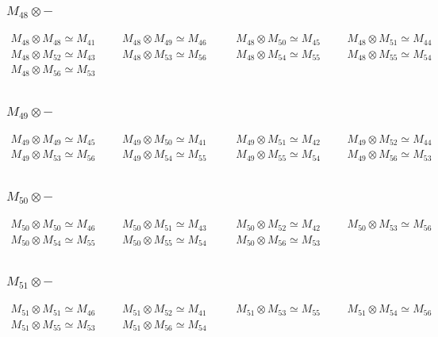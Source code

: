 \subsubsection{$M_48\otimes -$}
\begin{align*}
M_{48} \otimes M_{48} \simeq M_{41} &&& M_{48} \otimes M_{49} \simeq M_{46} &&\
& M_{48} \otimes M_{50} \simeq M_{45} &&& M_{48} \otimes M_{51} \simeq M_{44}\
\\
M_{48} \otimes M_{52} \simeq M_{43} &&& M_{48} \otimes M_{53} \simeq M_{56} &&\
& M_{48} \otimes M_{54} \simeq M_{55} &&& M_{48} \otimes M_{55} \simeq M_{54}\
\\
M_{48} \otimes M_{56} \simeq M_{53}\\
\end{align*}

\subsubsection{$M_49\otimes -$}
\begin{align*}
M_{49} \otimes M_{49} \simeq M_{45} &&& M_{49} \otimes M_{50} \simeq M_{41} &&\
& M_{49} \otimes M_{51} \simeq M_{42} &&& M_{49} \otimes M_{52} \simeq M_{44}\
\\
M_{49} \otimes M_{53} \simeq M_{56} &&& M_{49} \otimes M_{54} \simeq M_{55} &&\
& M_{49} \otimes M_{55} \simeq M_{54} &&& M_{49} \otimes M_{56} \simeq M_{53}\
\\
\end{align*}

\subsubsection{$M_50\otimes -$}
\begin{align*}
M_{50} \otimes M_{50} \simeq M_{46} &&& M_{50} \otimes M_{51} \simeq M_{43} &&\
& M_{50} \otimes M_{52} \simeq M_{42} &&& M_{50} \otimes M_{53} \simeq M_{56}\
\\
M_{50} \otimes M_{54} \simeq M_{55} &&& M_{50} \otimes M_{55} \simeq M_{54} &&\
& M_{50} \otimes M_{56} \simeq M_{53}\\
\end{align*}

\subsubsection{$M_51\otimes -$}
\begin{align*}
M_{51} \otimes M_{51} \simeq M_{46} &&& M_{51} \otimes M_{52} \simeq M_{41} &&\
& M_{51} \otimes M_{53} \simeq M_{55} &&& M_{51} \otimes M_{54} \simeq M_{56}\
\\
M_{51} \otimes M_{55} \simeq M_{53} &&& M_{51} \otimes M_{56} \simeq M_{54}\\
\end{align*}

